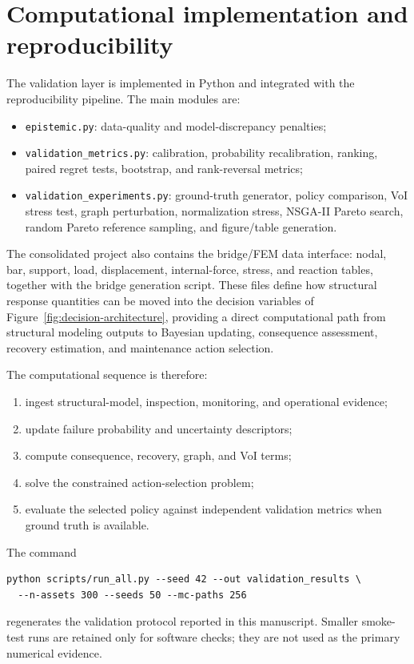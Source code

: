 \documentclass[cmes,article,submit,moreauthors,pdftex]{Definitions/tsp}
\begin{document}
\section{Computational implementation and reproducibility}

The validation layer is implemented in Python and integrated with the reproducibility pipeline. The main modules are:
\begin{itemize}[leftmargin=*]
    \item \texttt{epistemic.py}: data-quality and model-discrepancy penalties;
    \item \texttt{validation\_metrics.py}: calibration, probability recalibration, ranking, paired regret tests, bootstrap, and rank-reversal metrics;
    \item \texttt{validation\_experiments.py}: ground-truth generator, policy comparison, VoI stress test, graph perturbation, normalization stress, NSGA-II Pareto search, random Pareto reference sampling, and figure/table generation.
\end{itemize}
The consolidated project also contains the bridge/FEM data interface: nodal, bar, support, load, displacement, internal-force, stress, and reaction tables, together with the bridge generation script. These files define how structural response quantities can be moved into the decision variables of Figure~\ref{fig:decision-architecture}, providing a direct computational path from structural modeling outputs to Bayesian updating, consequence assessment, recovery estimation, and maintenance action selection.

The computational sequence is therefore:
\begin{enumerate}[leftmargin=*]
    \item ingest structural-model, inspection, monitoring, and operational evidence;
    \item update failure probability and uncertainty descriptors;
    \item compute consequence, recovery, graph, and VoI terms;
    \item solve the constrained action-selection problem;
    \item evaluate the selected policy against independent validation metrics when ground truth is available.
\end{enumerate}
The command
\begin{verbatim}
python scripts/run_all.py --seed 42 --out validation_results \
  --n-assets 300 --seeds 50 --mc-paths 256
\end{verbatim}
regenerates the validation protocol reported in this manuscript. Smaller smoke-test runs are retained only for software checks; they are not used as the primary numerical evidence.
\end{document}

